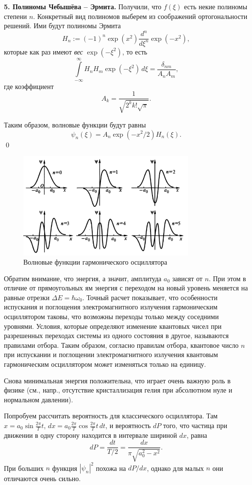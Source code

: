 \textbf{5. Полиномы Чебышёва -- Эрмита.} Получили, что $ f(\xi) $ есть некие
полиномы степени $ n $. Конкретный вид полиномов выберем из соображений
ортогональности решений. Ими будут полиномы Эрмита  
\[
  H_n := (-1)^n \exp(x^2) \frac{d^n}{d\xi^n}\exp(-x^2),
\]
которые как раз имеют
\emph{вес} $ \exp(-\xi^2) $, то есть 
\[
  \int\limits_{-\infty}^{\infty}H_n H_m \exp(-\xi^2)\,d\xi =
  \frac{\delta_{nm}}{A_nA_m},
\]
где коэффициент 
\[
  A_k = \frac{1}{\sqrt{2^kk!\sqrt{\pi}}}.
\]

Таким образом, волновые функции будут равны 
\[
    \psi_n(\xi) = A_n \exp(-x^2/2) H_n(\xi).
\]
\qed

\begin{figure}[h]
  \centering
  \includegraphics[width=0.8\textwidth]{img/write-02/psi.png}
  \caption{Волновые функции гармонического осциллятора}
  \label{fig:psi}
\end{figure}

Обратим внимание, что энергия, а значит, амплитуда $ a_0 $ зависят от $ n $. При
этом в отличие от прямоугольных ям энергия с переходом на новый уровень меняется
на равные отрезки $ \Delta E = \hbar\omega_0 $. Точный расчет
показывает, что особенности испускания и поглощения 
электромагнитного излучения гармоническим осциллятором таковы, что 
возможны переходы только между соседними уровнями. Условия, которые определяют
изменение квантовых чисел при разрешенных переходах системы из одного состояния в другое,
называются правилами отбора. Таким образом, согласно правилам
отбора, квантовое число $ n $ при испускании и поглощении 
электромагнитного излучения квантовым гармоническим осциллятором
может изменяться только на единицу.

Снова минимальная энергия положительна, что играет очень важную роль в физике (см., напр.,
отсутствие кристаллизация гелия при абсолютном нуле и нормальном давлении).

Попробуем рассчитать вероятность для классического осциллятора. Там $ x =
a_0\sin \frac{2\pi}{T}t $, $ dx = a_0 \frac{2\pi}{T} \cos \frac{2\pi}{T}t\,dt $,
и вероятность $ dP $ того, что
частица при движении в одну сторону находится в интервале шириной $ dx $,
равна 
\[
  dP = \frac{dt}{T/2} = \frac{dx}{\pi\sqrt{a_0^2 - x^2}}.
\]
При больших $ n $ функция $ |\psi_n|^2 $ похожа на $ dP/dx $, однако для малых
$ n $ они отличаются очень сильно.

